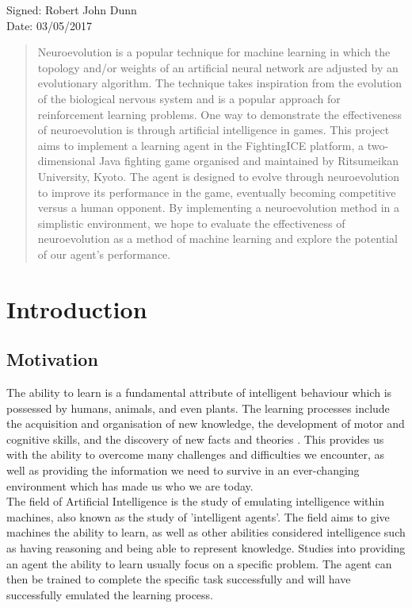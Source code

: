 \documentclass[12pt,a4paper]{article}
\begin{document}
Signed: Robert John Dunn\\

Date: 03/05/2017
\newpage
\thispagestyle{empty}
\begin{abstract}
Neuroevolution is a popular technique for machine learning in which the topology and/or weights of an artificial neural network are adjusted by an evolutionary algorithm. The technique takes inspiration from the evolution of the biological nervous system and is a popular approach for reinforcement learning problems. One way to demonstrate the effectiveness of neuroevolution is through artificial intelligence in games. This project aims to implement a learning agent in the FightingICE platform, a two-dimensional Java fighting game organised and maintained by Ritsumeikan University, Kyoto. The agent is designed to evolve through neuroevolution to improve its performance in the game, eventually becoming competitive versus a human opponent. By implementing a neuroevolution method in a simplistic environment, we hope to evaluate the effectiveness of neuroevolution as a method of machine learning and explore the potential of our agent's performance.
\end{abstract}
\newpage
\thispagestyle{empty}
\tableofcontents
\newpage
\section{Introduction}
\subsection{Motivation}
\onehalfspace
The ability to learn is a fundamental attribute of intelligent behaviour which is possessed by humans, animals, and even plants. The learning processes include the acquisition and organisation of new knowledge, the development of motor and cognitive skills, and the discovery of new facts and theories \cite{michalski}. This provides us with the ability to overcome many challenges and difficulties we encounter, as well as providing the information we need to survive in an ever-changing environment which has made us who we are today.\\

The field of Artificial Intelligence is the study of emulating intelligence within machines, also known as the study of 'intelligent agents'. The field aims to give machines the ability to learn, as well as other abilities considered intelligence such as having reasoning and being able to represent knowledge. Studies into providing an agent the ability to learn usually focus on a specific problem. The agent can then be trained to complete the specific task successfully and will have successfully emulated the learning process.\\ 
\end{document}
